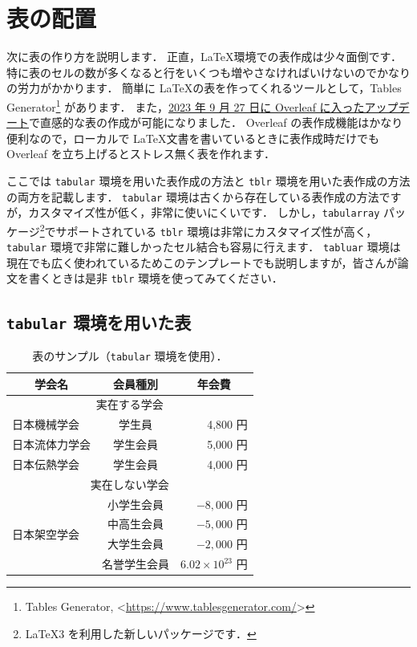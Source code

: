 \section{表の配置}
\label{sec:table}

次に表の作り方を説明します．
正直，\LaTeX 環境での表作成は少々面倒です．
特に表のセルの数が多くなると行をいくつも増やさなければいけないのでかなりの労力がかかります．
簡単に \LaTeX の表を作ってくれるツールとして，Tables Generator\footnote{Tables Generator, \textless\url{https://www.tablesgenerator.com/}\textgreater} があります．
また，\href{https://www.overleaf.com/blog/major-feature-news-add-and-edit-tables-without-writing-code}{2023 年 9 月 27 日に Overleaf に入ったアップデート}で直感的な表の作成が可能になりました．
Overleaf の表作成機能はかなり便利なので，ローカルで \LaTeX 文書を書いているときに表作成時だけでも Overleaf を立ち上げるとストレス無く表を作れます．

ここでは \verb|tabular| 環境を用いた表作成の方法と \verb|tblr| 環境を用いた表作成の方法の両方を記載します．
\verb|tabular| 環境は古くから存在している表作成の方法ですが，カスタマイズ性が低く，非常に使いにくいです．
しかし，\verb|tabularray| パッケージ\footnote{\LaTeX3 を利用した新しいパッケージです．}でサポートされている \verb|tblr| 環境は非常にカスタマイズ性が高く，\verb|tabular| 環境で非常に難しかったセル結合も容易に行えます．
\verb|tabluar| 環境は現在でも広く使われているためこのテンプレートでも説明しますが，皆さんが論文を書くときは是非 \verb|tblr| 環境を使ってみてください．

\subsection{\texttt{tabular} 環境を用いた表}
\label{ssec:tabular}

\begin{table}[tp]
    \centering
    \caption{表のサンプル（\texttt{tabular} 環境を使用）．}
    \label{table:tabular}
    \begin{tabular}{l|c|r} \hline\hline
        \multicolumn{1}{c|}{学会名}  & 会員種別  & \multicolumn{1}{c}{年会費} \\ \hline
        \multicolumn{3}{c}{実在する学会} \\ \hline
        日本機械学会    & 学生員    & 4,800 円 \\ \hline
        日本流体力学会  & 学生会員  & 5,000 円 \\ \hline
        日本伝熱学会    & 学生会員  & 4,000 円 \\ \hline
        \multicolumn{3}{c}{実在しない学会} \\ \hline
        \multirow{4}{*}{日本架空学会}& 小学生会員  & $-8,000$ 円 \\ \cline{2-3}
        & 中高生会員  & $-5,000$ 円 \\ \cline{2-3}
        & 大学生会員  & $-2,000$ 円 \\ \cline{2-3}
        & 名誉学生会員  & $6.02 \times 10^{23}$ 円 \\ \hline
    \end{tabular}
\end{table}

